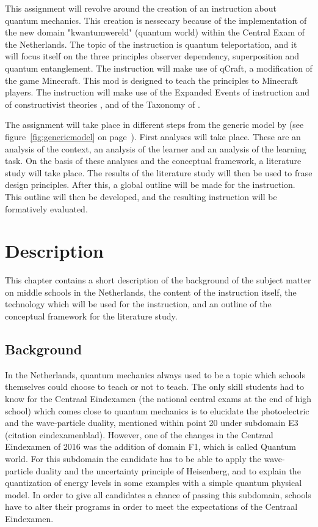 \documentclass[12pt]{report} %
\begin{document}
This assignment will revolve around the creation of an instruction about quantum mechanics. This creation is nessecary because of the implementation of the new domain "kwantumwereld" (quantum world) within the Central Exam of the Netherlands. The topic of the instruction is quantum teleportation, and it will focus itself on the three principles observer dependency, superposition and quantum entanglement. The instruction will make use of qCraft, a modification of the game Minecraft. This mod is designed to teach the principles to Minecraft players. The instruction will make use of the Expanded Events of instruction and of constructivist theories \cite{smithragan}, and of the Taxonomy of .

The assignment will take place in different steps from the generic model by  (see figure~\ref{fig:genericmodel} on page~\pageref{fig:genericmodel}). First analyses will take place. These are an analysis of the context, an analysis of the learner and an analysis of the learning task. On the basis of these analyses and the conceptual framework, a literature study will take place. The results of the literature study will then be used to frase design principles. After this, a global outline will be made for the instruction. This outline will then be developed, and the resulting instruction will be formatively evaluated.

\chapter{Description}

This chapter contains a short description of the background of the subject matter on middle schools in the Netherlands, the content of the instruction itself, the technology which will be used for the instruction, and an outline of the conceptual framework for the literature study.

\section{Background}

In the Netherlands, quantum mechanics always used to be a topic which schools themselves could choose to teach or not to teach. The only skill students had to know for the Centraal Eindexamen (the national central exams at the end of high school) which comes close to quantum mechanics is to elucidate the photoelectric and the wave-particle duality, mentioned within point 20 under subdomain E3 (citation eindexamenblad). However, one of the changes in the Centraal Eindexamen of 2016 was the addition of domain F1, which is called Quantum world. For this subdomain the candidate has to be able to apply the wave-particle duality and the uncertainty principle of Heisenberg, and to explain the quantization of energy levels in some examples with a simple quantum physical model. In order to give all candidates a chance of passing this subdomain, schools have to alter their programs in order to meet the expectations of the Centraal Eindexamen.
\end{document}

